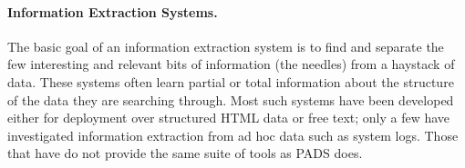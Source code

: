 

\paragraph*{Information Extraction Systems.}
The basic goal of an information extraction system is 
to find and separate the few interesting and relevant bits of information 
(the needles) from a haystack of data.  These systems often learn partial
or total information about the structure of the data they are searching
through.  Most such systems have been developed either for
deployment over structured HTML data or free text; only a few have investigated
information extraction from ad hoc data such as system logs.  Those that have 
do not provide the same suite of tools as PADS does.

